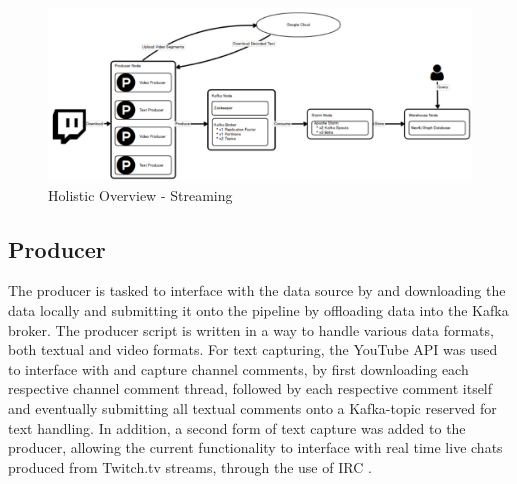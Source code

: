 \documentclass[10pt,conference]{IEEEtran}
\begin{document}
\begin{figure}
  \includegraphics[width=\linewidth]{HolisticOverviewStreaming.png}
  \caption                          {Holistic Overview - Streaming}
  \label                            {fig:HolisticOverviewStreaming}
\end{figure}

\subsection{Producer}
The producer is tasked to interface with the data source by and downloading the data locally and submitting it onto the pipeline by offloading data into the Kafka broker. The producer script is written in a way to handle various data formats, both textual and video formats. For text capturing, the YouTube API \cite{YouTubeAPI} was used to interface with and capture channel comments, by first downloading each respective channel comment thread, followed by each respective comment itself and eventually submitting all textual comments onto a Kafka-topic reserved for text handling. In addition, a second form of text capture was added to the producer, allowing the current functionality to interface with real time live chats produced from Twitch.tv streams, through the use of IRC \cite{TwitchChatBot}.
\end{document}
